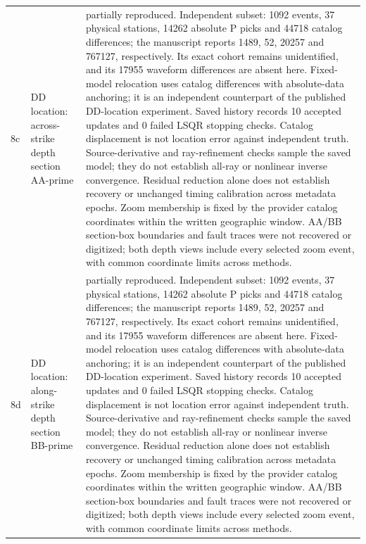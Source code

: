 \begin{longtable}{>{\raggedright\arraybackslash}p{}>{\raggedright\arraybackslash}p{}>{\raggedright\arraybackslash}p{}}
8c & DD location: across-strike depth section AA-prime & partially reproduced. Independent subset: 1092 events, 37 physical stations, 14262 absolute P picks and 44718 catalog differences; the manuscript reports 1489, 52, 20257 and 767127, respectively. Its exact cohort remains unidentified, and its 17955 waveform differences are absent here. Fixed-model relocation uses catalog differences with absolute-data anchoring; it is an independent counterpart of the published DD-location experiment. Saved history records 10 accepted updates and 0 failed LSQR stopping checks. Catalog displacement is not location error against independent truth. Source-derivative and ray-refinement checks sample the saved model; they do not establish all-ray or nonlinear inverse convergence. Residual reduction alone does not establish recovery or unchanged timing calibration across metadata epochs. Zoom membership is fixed by the provider catalog coordinates within the written geographic window. AA/BB section-box boundaries and fault traces were not recovered or digitized; both depth views include every selected zoom event, with common coordinate limits across methods.\\
8d & DD location: along-strike depth section BB-prime & partially reproduced. Independent subset: 1092 events, 37 physical stations, 14262 absolute P picks and 44718 catalog differences; the manuscript reports 1489, 52, 20257 and 767127, respectively. Its exact cohort remains unidentified, and its 17955 waveform differences are absent here. Fixed-model relocation uses catalog differences with absolute-data anchoring; it is an independent counterpart of the published DD-location experiment. Saved history records 10 accepted updates and 0 failed LSQR stopping checks. Catalog displacement is not location error against independent truth. Source-derivative and ray-refinement checks sample the saved model; they do not establish all-ray or nonlinear inverse convergence. Residual reduction alone does not establish recovery or unchanged timing calibration across metadata epochs. Zoom membership is fixed by the provider catalog coordinates within the written geographic window. AA/BB section-box boundaries and fault traces were not recovered or digitized; both depth views include every selected zoom event, with common coordinate limits across methods.\\

\end{longtable}
